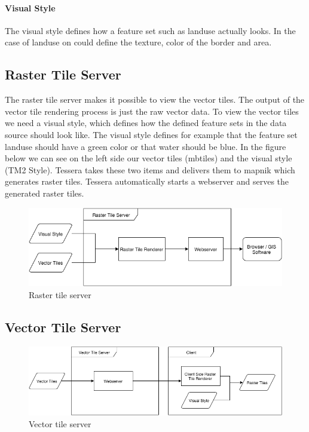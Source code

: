 \paragraph{Visual Style} The visual style defines how a feature set such as landuse actually looks. In the case of landuse on could define the texture, color of the border and area.

\subsection{Raster Tile Server}

The raster tile server makes it possible to view the vector tiles. The output of the vector tile rendering process is just the raw vector data. To view the vector tiles we need a visual style, which defines how the defined feature sets in the data source should look like. The visual style defines for example that the feature set landuse should have a green color or that water should be blue. In the figure below we can see on the left side our vector tiles (mbtiles) and the visual style (TM2 Style). Tessera takes these two items and delivers them to mapnik which generates raster tiles. Tessera automatically starts a webserver and serves the generated raster tiles.

\begin{figure}[h]

  \centering
  \includegraphics[width=1\textwidth]{images/raster_tile_server.png}
  \caption{Raster tile server}
\end{figure}

\subsection{Vector Tile Server}

\begin{figure}[h]

  \centering
  \includegraphics[width=1\textwidth]{images/vector_tile_server.png}
  \caption{Vector tile server}
\end{figure}



\newpage